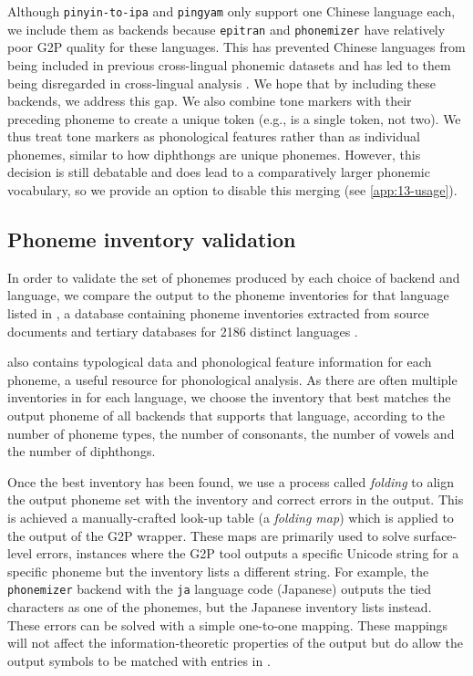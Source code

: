 Although \texttt{pinyin-to-ipa} and \texttt{pingyam} only support one Chinese language each, we include them as backends because \texttt{epitran} and \texttt{phonemizer} have relatively poor G2P quality for these languages. This has prevented Chinese languages from being included in previous cross-lingual phonemic datasets \citep{ahn-chodroff-2022-voxcommunis} and has led to them being disregarded in cross-lingual analysis \citep{pimentel2020phonotactic}. We hope that by including these backends, we address this gap. We also combine tone markers with their preceding phoneme to create a unique token (e.g.,  is a single token, not two). We thus treat tone markers as phonological features rather than as individual phonemes, similar to how diphthongs are unique phonemes. However, this decision is still debatable and does lead to a comparatively larger phonemic vocabulary, so we provide an option to disable this merging (see \cref{app:13-usage}). %

\subsection{Phoneme inventory validation}\label{sec:13-folding}

In order to validate the set of phonemes produced by each choice of backend and language, we compare the output to the phoneme inventories for that language listed in \phoible, a database containing phoneme inventories extracted from source documents and tertiary databases for 2186 distinct languages \citep{phoible}.

\phoible also contains typological data and phonological feature information for each phoneme, a useful resource for phonological analysis. As there are often multiple inventories in \phoible for each language, we choose the inventory that best matches the output phoneme of all backends that supports that language, according to the number of phoneme types, the number of consonants, the number of vowels and the number of diphthongs.

Once the best inventory has been found, we use a process called \emph{folding} to align the output phoneme set with the inventory and correct errors in the output. This is achieved a manually-crafted look-up table (a \emph{folding map}) which is applied to the output of the G2P wrapper. These maps are primarily used to solve surface-level errors, instances where the G2P tool outputs a specific Unicode string for a specific phoneme but the inventory lists a different string. For example, the \texttt{phonemizer} backend with the \texttt{ja} language code (Japanese) outputs the tied characters  as one of the phonemes, but the Japanese inventory lists  instead. These errors can be solved with a simple one-to-one mapping. These mappings will not affect the information-theoretic properties of the output but do allow the output symbols to be matched with entries in \phoible.

